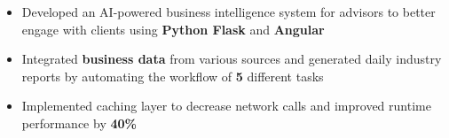 \documentclass[10pt,a4paper]{altacv}
\begin{document}
\begin{itemize}
  \item Developed an AI-powered business intelligence system for advisors to better engage with clients using \textbf{Python Flask} and \textbf{Angular}
  \item Integrated \textbf{business data} from various sources and generated daily industry reports by automating the workflow of \textbf{5} different tasks
  \item Implemented caching layer to decrease network calls and improved runtime performance by \textbf{40\%}

 \end{itemize} 




         \\
       
\divider\smallskip
{}     
 


\vspace{2.3mm}
\vspace{2.3mm}
\end{document}
